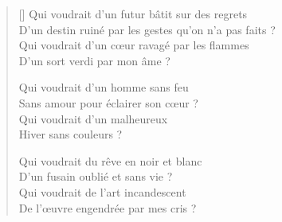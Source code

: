 \newpage

\settowidth{\versewidth}{D'un destin ruiné par les gestes qu'on n'a pas faits ?}
\begin{verse}[\versewidth]
Qui voudrait d'un futur bâtit sur des regrets \\
D'un destin ruiné par les gestes qu'on n'a pas faits ? \\
Qui voudrait d'un cœur ravagé par les flammes \\
D'un sort verdi par mon âme ?


Qui voudrait d'un homme sans feu \\
Sans amour pour éclairer son cœur ? \\
Qui voudrait d'un malheureux \\
Hiver sans couleurs ?


Qui voudrait du rêve en noir et blanc \\
D'un fusain oublié et sans vie ? \\
Qui voudrait de l'art incandescent \\
De l'œuvre engendrée par mes cris ?
\end{verse}

\newpage

